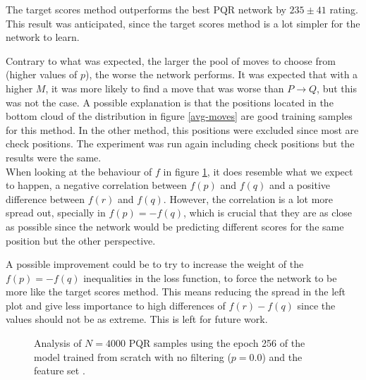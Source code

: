 The target scores method outperforms the best PQR network by $235 \pm 41$ rating. This result was anticipated, since the target scores method is a lot simpler for the network to learn.

Contrary to what was expected, the larger the pool of moves to choose from (higher values of $p$), the worse the network performs. It was expected that with a higher $M$, it was more likely to find a move that was worse than $P \rightarrow Q$, but this was not the case. A possible explanation is that the positions located in the bottom cloud of the distribution in figure \ref{avg-moves} are good training samples for this method. In the other method, this positions were excluded since most are check positions. The experiment was run again including check positions but the results were the same. \\

\newpage
When looking at the behaviour of $f$ in figure \ref{pqr-scratch}, it does resemble what we expect to happen, a negative correlation between $f(p)$ and $f(q)$ and a positive difference between $f(r)$ and $f(q)$. However, the correlation is a lot more spread out, specially in $f(p)=-f(q)$, which is crucial that they are as close as possible since the network would be predicting different scores for the same position but the other perspective.

A possible improvement could be to try to increase the weight of the $f(p)=-f(q)$ inequalities in the loss function, to force the network to be more like the target scores method. This means reducing the spread in the left plot and give less importance to high differences of $f(r)-f(q)$ since the values should not be as extreme. This is left for future work.

\begin{figure}[H]
\centering
{}
\caption{Analysis of $N=4000$ PQR samples using the epoch 256 of the model trained from scratch with no filtering ($p=0.0$) and the feature set .}
\label{pqr-scratch}
\end{figure}


